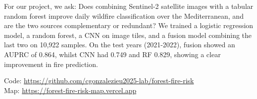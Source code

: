 \documentclass[clean,onecolumn]{bam-project}
\begin{document}
\makebamtitle
\BAMannotationnotice

\begin{BAMabstract}

For our project, we ask: Does combining Sentinel-2 satellite images with a tabular random forest improve daily wildfire classification over the Mediterranean, and are the two sources complementary or redundant? We trained a logistic regression model, a random forest, a CNN on image tiles, and a fusion model combining the last two on 10,922 samples. On the test years (2021-2022), fusion showed an AUPRC of 0.864, whilst CNN had 0.749 and RF 0.829, showing a clear improvement in fire prediction.


\noindent Code: \url{https://github.com/cgonzalezieu2025-lab/forest-fire-risk}\\
Map: \url{https://forest-fire-risk-map.vercel.app}
\end{BAMabstract}








\BAMprintbibliography



\end{document}
